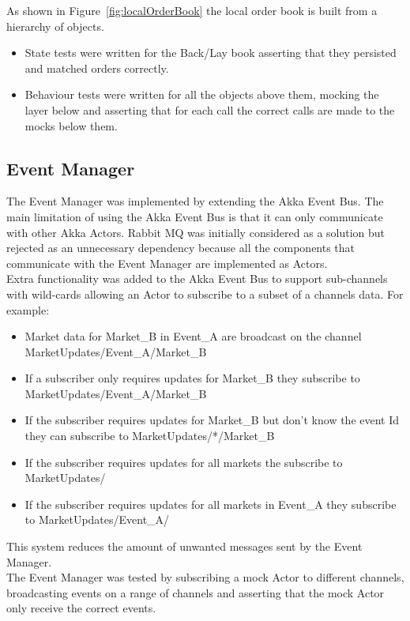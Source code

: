 		As shown in Figure~\ref{fig:localOrderBook} the local order book is built from a hierarchy of objects.
		\begin{itemize}
			\item State tests were written for the Back/Lay book asserting that they persisted and matched orders correctly.
			\item Behaviour tests were written for all the objects above them, mocking the layer below and asserting that for each call the correct calls are made to the mocks below them.			
		\end{itemize}

	\subsection{Event Manager}
	The Event Manager was implemented by extending the Akka Event Bus. The main limitation of using the Akka Event Bus is that it can only communicate with other Akka Actors. Rabbit MQ\cite{RabbitMQ} was initially considered as a solution but rejected as an unnecessary dependency because all the components that communicate with the Event Manager are implemented as Actors.\\
	
	Extra functionality was added to the Akka Event Bus to support sub-channels with wild-cards allowing an Actor to subscribe to a subset of a channels data. For example:
	
	\begin{itemize}
		\item Market data for Market\_B in Event\_A are broadcast on the channel MarketUpdates/Event\_A/Market\_B
		\item If a subscriber only requires updates for Market\_B they subscribe to MarketUpdates/Event\_A/Market\_B
		 \item If the subscriber requires updates for Market\_B but don't know the event Id they can subscribe to MarketUpdates/*/Market\_B
		 \item If the subscriber requires updates for all markets the subscribe to MarketUpdates/
		 \item If the subscriber requires updates for all markets in Event\_A they subscribe to MarketUpdates/Event\_A/
	\end{itemize}
	
	This system reduces the amount of unwanted messages sent by the Event Manager.\\
	
	The Event Manager was tested by subscribing a mock Actor to different channels, broadcasting events on a range of channels and asserting that the mock Actor only receive the correct events.

